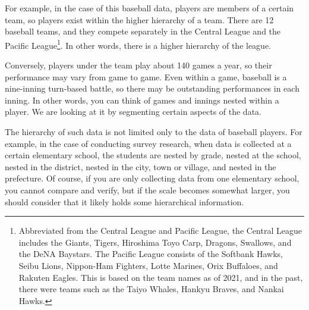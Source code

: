 \documentclass{ltjsbook}
\begin{document}
For example, in the case of this baseball data, players are members of a certain team, so players exist within the higher hierarchy of a team. There are 12 baseball teams, and they compete separately in the Central League and the Pacific League\footnote{Abbreviated from the Central League and Pacific League, the Central League includes the Giants, Tigers, Hiroshima Toyo Carp, Dragons, Swallows, and the DeNA Baystars. The Pacific League consists of the Softbank Hawks, Seibu Lions, Nippon-Ham Fighters, Lotte Marines, Orix Buffaloes, and Rakuten Eagles. This is based on the team names as of 2021, and in the past, there were teams such as the Taiyo Whales, Hankyu Braves, and Nankai Hawks.}. In other words, there is a higher hierarchy of the league.

Conversely, players under the team play about 140 games a year, so their performance may vary from game to game. Even within a game, baseball is a nine-inning turn-based battle, so there may be outstanding performances in each inning. In other words, you can think of games and innings nested within a player. We are looking at it by segmenting certain aspects of the data.

The hierarchy of such data is not limited only to the data of baseball players. For example, in the case of conducting survey research, when data is collected at a certain elementary school, the students are nested by grade, nested at the school, nested in the district, nested in the city, town or village, and nested in the prefecture. Of course, if you are only collecting data from one elementary school, you cannot compare and verify, but if the scale becomes somewhat larger, you should consider that it likely holds some hierarchical information.
\end{document}

